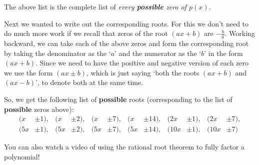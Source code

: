 \documentclass{ximera}
\begin{document}
\begin{example}
        The above list is the complete list of \textit{every \textbf{possible} zero of $p(x)$}. 
        
        Next we wanted to write out the corresponding roots. For this we don't need to do much more work if we recall that zeros of the root $(ax + b)$ are $-\frac{b}{a}$. Working backward, we can take each of the above zeros and form the corresponding root by taking the denominator as the `$a$' and the numerator as the `$b$' in the form $(ax + b)$. Since we need to have the positive and negative version of each zero we use the form $(ax \pm b)$, which is just saying `both the roots $(ax + b)$ and $(ax - b)$', to denote both at the same time.
        
        So, we get the following list of \textbf{possible} roots (corresponding to the list of \textbf{possible} zeros above):
        \begin{align*}
            (x &\pm 1),     &(x &\pm 2),    &(x &\pm 7),    &(x &\pm 14),   &(2x &\pm 1),   &(2x &\pm 7), \\
            (5x &\pm 1),    &(5x &\pm 2),   &(5x &\pm 7),   &(5x &\pm 14),  &(10x &\pm 1),  &(10x &\pm 7)
        \end{align*}
        \end{example}

You can also watch a video of using the rational root theorem to fully factor a polynomial!
\end{document}
